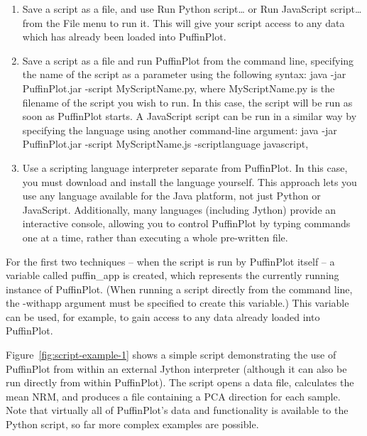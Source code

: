 \documentclass[a4paper,british]{article}
\newcommand{\ppcmd}[1]{\textsf{#1}} %
\newcommand{\caps}[1]{\MakeTextUppercase{#1}} %
\begin{document}
\begin{enumerate}

\item Save a script as a file, and use \ppcmd{Run Python script\ldots}
  or \ppcmd{Run JavaScript script\ldots} from the \ppcmd{File} menu to
  run it. This will give your script access to any data which has
  already been loaded into PuffinPlot.

\item Save a script as a file and run PuffinPlot from the command line,
  specifying the name of the script as a parameter using the following
  syntax: \ppcmd{java -jar PuffinPlot.jar -script MyScriptName.py},
  where \ppcmd{MyScriptName.py} is the filename of the script you wish
  to run. In this case, the script will be run as soon as PuffinPlot
  starts. A JavaScript script can be run in a similar way by specifying
  the language using another command-line argument: \ppcmd{java -jar
    PuffinPlot.jar -script MyScriptName.js -scriptlanguage javascript},

\item Use a scripting language interpreter separate from PuffinPlot. In
  this case, you must download and install the language yourself. This
  approach lets you use any language available for the Java platform,
  not just Python or JavaScript. Additionally, many languages (including
  Jython) provide an interactive console, allowing you to control
  PuffinPlot by typing commands one at a time, rather than executing a
  whole pre-written file.

\end{enumerate}

For the first two techniques -- when the script is run by PuffinPlot
itself -- a variable called \ppcmd{puffin\_app} is created, which
represents the currently running instance of PuffinPlot. (When running a
script directly from the command line, the \ppcmd{-withapp} argument
must be specified to create this variable.) This variable can be used,
for example, to gain access to any data already loaded into PuffinPlot.

Figure~\ref{fig:script-example-1} shows a simple script demonstrating the use
of PuffinPlot from within an external Jython interpreter (although it can
also be run directly from within PuffinPlot). The script opens a data file,
calculates the mean \caps{nrm}, and produces a file containing a \caps{pca}
direction for each sample. Note that virtually all of PuffinPlot's data and
functionality is available to the Python script, so far more complex examples
are possible.
\end{document}
